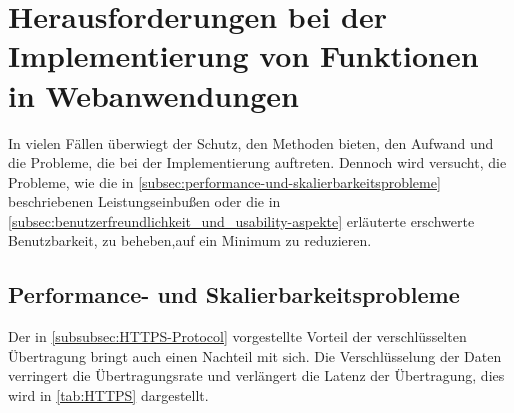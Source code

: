 \newpage
\section[Herausforderungen bei der Implementierung von kryptografischen Funktionen in Webanwendungen]{Herausforderungen bei der Implementierung von  Funktionen in Webanwendungen}\label{sec:Herausforderung-bei-der-implementierung-von-kryptografie-in-webanwendungen}
In vielen Fällen überwiegt der Schutz, den  Methoden bieten, den Aufwand und die Probleme, die bei der Implementierung auftreten.
Dennoch wird versucht, die Probleme, wie \zb die in \autoref{subsec:performance-und-skalierbarkeitsprobleme} beschriebenen Leistungseinbußen oder die in \autoref{subsec:benutzerfreundlichkeit_und_usability-aspekte} erläuterte erschwerte Benutzbarkeit, zu beheben,\bzw auf ein Minimum zu reduzieren.

\subsection[Performance- und Skalierbarkeitsprobleme]{Performance- und Skalierbarkeitsprobleme}\label{subsec:performance-und-skalierbarkeitsprobleme}
Der in \autoref{subsubsec:HTTPS-Protocol} vorgestellte Vorteil der verschlüsselten Übertragung bringt auch einen Nachteil mit sich.
Die Verschlüsselung der Daten verringert die Übertragungsrate und verlängert die Latenz der Übertragung\autocite[]{goldberg-comparison-nodate}, dies wird in \autoref{tab:HTTPS}\autocite[Übersetzt nach:][]{goldberg-comparison-nodate} dargestellt.

